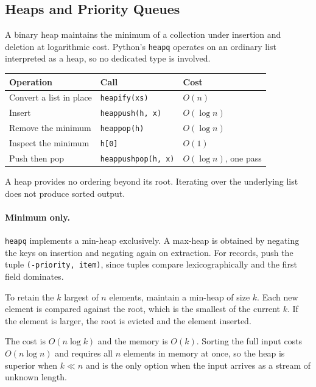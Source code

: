 \subsection{Heaps and Priority Queues}

A binary heap maintains the minimum of a collection under insertion and
deletion at logarithmic cost. Python's \texttt{heapq} operates on an ordinary
list interpreted as a heap, so no dedicated type is involved.

\begin{center}
\begin{tabular}{lll}
\toprule
\textbf{Operation} & \textbf{Call} & \textbf{Cost} \\
\midrule
Convert a list in place & \texttt{heapify(xs)}     & $O(n)$ \\
Insert                  & \texttt{heappush(h, x)}  & $O(\log n)$ \\
Remove the minimum      & \texttt{heappop(h)}      & $O(\log n)$ \\
Inspect the minimum     & \texttt{h[0]}            & $O(1)$ \\
Push then pop           & \texttt{heappushpop(h, x)} & $O(\log n)$, one pass \\
\bottomrule
\end{tabular}
\end{center}

A heap provides no ordering beyond its root. Iterating over the underlying
list does not produce sorted output.

\paragraph{Minimum only.} \texttt{heapq} implements a min-heap exclusively. A
max-heap is obtained by negating the keys on insertion and negating again on
extraction. For records, push the tuple \texttt{(-priority, item)}, since
tuples compare lexicographically and the first field dominates.

\begin{keybox}
To retain the $k$ largest of $n$ elements, maintain a min-heap of size $k$.
Each new element is compared against the root, which is the smallest of the
current $k$. If the element is larger, the root is evicted and the element
inserted.

The cost is $O(n \log k)$ and the memory is $O(k)$. Sorting the full input
costs $O(n \log n)$ and requires all $n$ elements in memory at once, so the
heap is superior when $k \ll n$ and is the only option when the input arrives
as a stream of unknown length.
\end{keybox}

